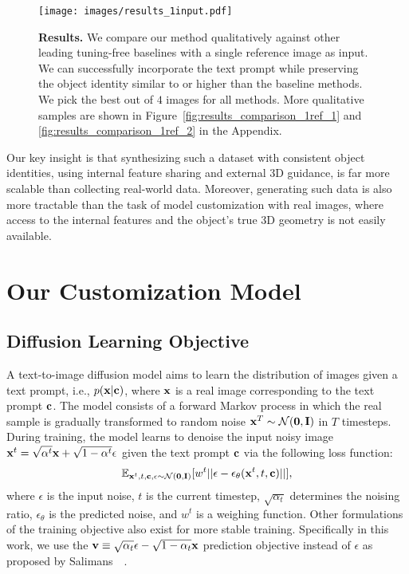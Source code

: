\begin{figure*}[!t]
    \centering
    \texttt{[image: images/results\_1input.pdf]}
    \vspace{-25pt}
    \caption{{\textbf{Results.} We compare our method qualitatively against other leading tuning-free baselines with a single reference image as input. We can successfully incorporate the text prompt while preserving the object identity similar to or higher than the baseline methods. We pick the best out of $4$ images for all methods. More qualitative samples are shown in Figure~\ref{fig:results_comparison_1ref_1} and \ref{fig:results_comparison_1ref_2} in the Appendix.
    }}
    \vspace{-10pt}
\end{figure*}

 Our key insight is that synthesizing such a dataset with consistent object identities, using internal feature sharing and external 3D guidance, is far more scalable than collecting real-world data. Moreover, generating such data is also more tractable than the task of model customization with real images, where access to the internal features and the object's true 3D geometry is not easily available.

\section{Our Customization Model}

\subsection{Diffusion Learning Objective}
A text-to-image diffusion model aims to learn the distribution of images given a text prompt, i.e., $p({\mathbf{x}} | {\mathbf{c}})$, where ${\mathbf{x}}$ is a real image corresponding to the text prompt ${\mathbf{c}}$. The model consists of a forward Markov process in which the real sample is gradually transformed to random noise ${\mathbf{x}}^T \sim \mathcal{N} (\mathbf{0}, \mathbf{I})$ in $T$ timesteps. During training, the model learns to denoise the input noisy image ${\mathbf{x}}^{t} = \sqrt{\alpha^t}{\mathbf{x}} + \sqrt{1 - \alpha^t}\epsilon $ given the text prompt ${\mathbf{c}}$ via the following loss function: 
\begin{equation}
    \begin{aligned}
        \mathbb{E}_{{\mathbf{x}}^t,t,\mathbf{c}, \epsilon \sim \mathcal{N} (\mathbf{0}, \mathbf{I})} [w^t||\epsilon - \epsilon_{\theta} ({\mathbf{x}}^t, t, \mathbf{c}) ||],
    \end{aligned}
\end{equation}
where $\epsilon$ is the input noise, $t$ is the current timestep, $\sqrt{\alpha_t}$ determines the noising ratio, $\epsilon_{\theta}$ is the predicted noise, and $w^t$ is a weighing function. Other formulations of the training objective also exist for more stable training. Specifically in this work, we use the $\mathbf{v} \equiv \sqrt{\alpha_t}\epsilon - \sqrt{1-\alpha_t}{\mathbf{x}} $ prediction objective instead of $\epsilon$ as proposed by Salimans~\etal~\cite{salimans2022progressive}.

